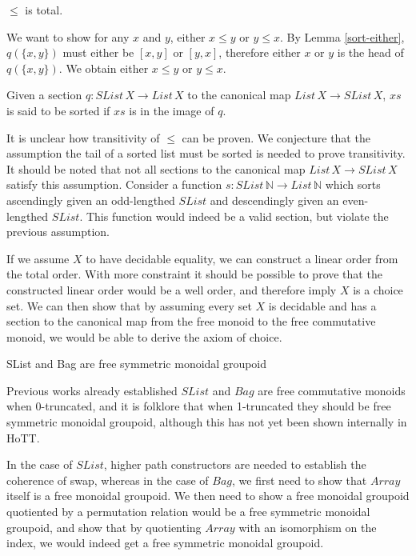 \documentclass{article}
\begin{document}
\begin{mythm}
    $\leq$ is total.
\end{mythm}
    We want to show for any $x$ and $y$, either $x \leq y$ or $y \leq x$.
    By Lemma \ref{sort-either}, $q(\{x, y\})$ must either be $[x, y]$ or $[y, x]$, therefore either $x$ or $y$
    is the head of $q(\{x, y\})$. We obtain either $x \leq y$ or $y \leq x$.

\begin{mydef}
    Given a section $q : SList \, X \rightarrow List \, X$ to the canonical map $List \, X \rightarrow SList \, X$,
    $xs$ is said to be sorted if $xs$ is in the image of $q$.
\end{mydef}

It is unclear how transitivity of $\leq$ can be proven. We conjecture that the assumption the tail of a sorted list
must be sorted is needed to prove transitivity. It should be noted that not all sections to the canonical map $List \, X \rightarrow SList \, X$
satisfy this assumption. Consider a function $s : SList \, \mathbb{N} \rightarrow List \, \mathbb{N}$ which sorts ascendingly given an odd-lengthed
$SList$ and descendingly given an even-lengthed $SList$. This function would indeed be a valid section, but violate the previous assumption.

If we assume $X$ to have decidable equality, we can construct a linear order from the total order.
With more constraint it should be possible to prove that the constructed linear order would be a well order, and therefore imply $X$ is a choice
set. We can then show that by assuming every set $X$ is decidable and has a section to the canonical map from the free monoid to the free commutative monoid, we
would be able to derive the axiom of choice.

\begin{myconj}
    SList and Bag are free symmetric monoidal groupoid
\end{myconj}
Previous works already established $SList$ and $Bag$ are free commutative
monoids when 0-truncated, and it is folklore that when 1-truncated they should be free symmetric monoidal groupoid, although
this has not yet been shown internally in HoTT. 

In the case of $SList$, higher path constructors are needed to establish the coherence of swap, whereas in the case of
$Bag$, we first need to show that $Array$ itself is a free monoidal groupoid. We then need to show a free
monoidal groupoid quotiented by a permutation relation would be a free symmetric monoidal groupoid, and show that by quotienting
$Array$ with an isomorphism on the index, we would indeed get a free symmetric monoidal groupoid.


\printbibliography
\end{document}

